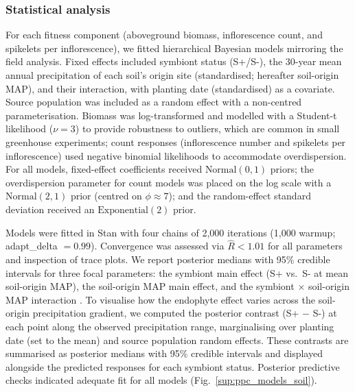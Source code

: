 \documentclass[12pt]{article}\usepackage[]{graphicx}\usepackage[dvipsnames]{xcolor}
\begin{document}
{\subsubsection {Statistical analysis}
{}
\label{sec:greenhouse_models}
For each fitness component (aboveground biomass, inflorescence count, and spikelets per inflorescence), we fitted hierarchical Bayesian models mirroring the field analysis. Fixed effects included symbiont status 
(S+/S-), the 30-year mean annual precipitation of each soil's origin site (standardised; hereafter soil-origin MAP), and their interaction, with planting date (standardised) as a covariate. 
Source population was included as a random effect with a non-centred parameterisation. 
Biomass was log-transformed and modelled with a Student-t likelihood ($\nu = 3$) to provide robustness to outliers, which are common in small greenhouse experiments; count responses (inflorescence number and spikelets 
per inflorescence) used negative binomial likelihoods to accommodate overdispersion. 
For all models, fixed-effect coefficients received $\text{Normal}(0, 1)$ priors; the overdispersion parameter for count models was placed on the log scale with a $\text{Normal}(2, 1)$ prior (centred on $\phi \approx 7$); and the random-effect standard deviation received an $\text{Exponential}(2)$ prior.

Models were fitted in Stan \citep{Rstan} with four chains of 2,000 iterations (1,000 warmup; adapt\_delta $= 0.99$). Convergence was assessed via $\hat{R} < 1.01$ for all parameters and inspection of trace plots.
We report posterior medians with 95\% credible intervals for three focal parameters: the symbiont main effect (S+ vs.\ S- at mean soil-origin MAP), the soil-origin MAP main effect, and the symbiont $\times$ soil-origin MAP interaction . 
To visualise how the endophyte effect varies across the soil-origin precipitation gradient, we computed the posterior contrast (S+ $-$ S-) 
at each point along the observed precipitation range, marginalising over planting date (set to the mean) and source population random effects. 
These contrasts are summarised as posterior medians with 95\% credible intervals and displayed alongside the predicted responses for each symbiont 
status. 
Posterior predictive checks indicated adequate fit for all models (Fig.~\ref{sup:ppc_models_soil}).
\clearpage

}
\end{document}
